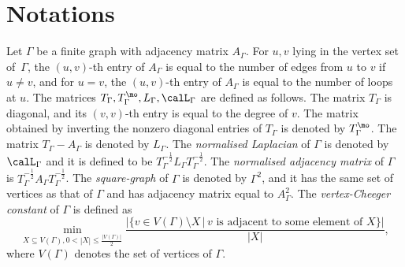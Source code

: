 \section{Notations}
Let $\Gamma$ be a finite graph with adjacency matrix $A_\Gamma$. 
For $u, v$ lying in the vertex set of~$\Gamma$, the $(u,v)$-th entry of $A_\Gamma$ is equal to the number of edges from $u$ to $v$ if $u\neq v$, and  for $u = v$, the $(u,v)$-th entry of $A_\Gamma$ is equal to the number of loops at $u$. The matrices $T_\Gamma, T_\Gamma^\mo, L_\Gamma, \calL_\Gamma$ are defined as follows. The matrix $T_\Gamma$ is diagonal, and its $(v, v)$-th entry is equal to the degree of $v$. The matrix obtained by inverting the nonzero diagonal entries of $T_\Gamma$ is denoted by $T_\Gamma^\mo$. The matrix $T_\Gamma - A_\Gamma$ is denoted by $L_\Gamma$. The \textit{normalised Laplacian} of $\Gamma$ is denoted by $\calL_\Gamma$ and it is defined to be $T_\Gamma^{-\frac 12} L_\Gamma T_\Gamma^{- \frac 12}$. The \textit{normalised adjacency matrix} of $\Gamma$ is $T_\Gamma^{-\frac 12} A_\Gamma T_\Gamma^{- \frac 12}$. The \textit{square-graph} of $\Gamma$ is denoted by $\Gamma^2$, and it has the same set of vertices as that of $\Gamma$ and has adjacency matrix equal to $A_\Gamma^2$. The \textit{vertex-Cheeger constant} of $\Gamma$ is defined as 
$$\min_{X\subseteq V(\Gamma), 0 < |X| \leq \frac{|V(\Gamma)|}2}
\frac{|\{v\in V(\Gamma) \setminus X\,|\, v \text{ is adjacent to some element of } X\}|}{|X|}
,$$
where $V(\Gamma)$ denotes the set of vertices of $\Gamma$. 

